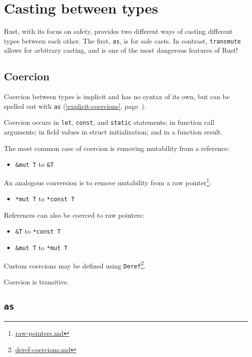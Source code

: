 \documentclass[a4paper,]{book}
\renewcommand*{\hyperref}[2][\ar]{%
  \def\ar{#2}%
  #2 (\autoref{#1}, page~\pageref{#1})}
\renewcommand{\href}[2]{#2\footnote{\url{#1}}}
\begin{document}
\section{Casting between types}\label{sec--casting-between-types}

Rust, with its focus on safety, provides two different ways of casting
different types between each other. The first, \texttt{as}, is for safe
casts. In contrast, \texttt{transmute} allows for arbitrary casting, and
is one of the most dangerous features of Rust!

\subsection{Coercion}\label{coercion}

Coercion between types is implicit and has no syntax of its own, but can
be spelled out with \hyperref[explicit-coercions]{\texttt{as}}.

Coercion occurs in \texttt{let}, \texttt{const}, and \texttt{static}
statements; in function call arguments; in field values in struct
initialization; and in a function result.

The most common case of coercion is removing mutability from a
reference:

\begin{itemize}
\itemsep1pt\parskip0pt
\item
  \texttt{\&mut\ T} to \texttt{\&T}
\end{itemize}

An analogous conversion is to remove mutability from a
\href{raw-pointers.md}{raw pointer}:

\begin{itemize}
\itemsep1pt\parskip0pt
\item
  \texttt{*mut\ T} to \texttt{*const\ T}
\end{itemize}

References can also be coerced to raw pointers:

\begin{itemize}
\item
  \texttt{\&T} to \texttt{*const\ T}
\item
  \texttt{\&mut\ T} to \texttt{*mut\ T}
\end{itemize}

Custom coercions may be defined using
\href{deref-coercions.md}{\texttt{Deref}}.

Coercion is transitive.

\subsection{\texorpdfstring{\texttt{as}}{as}}\label{as}
\end{document}

